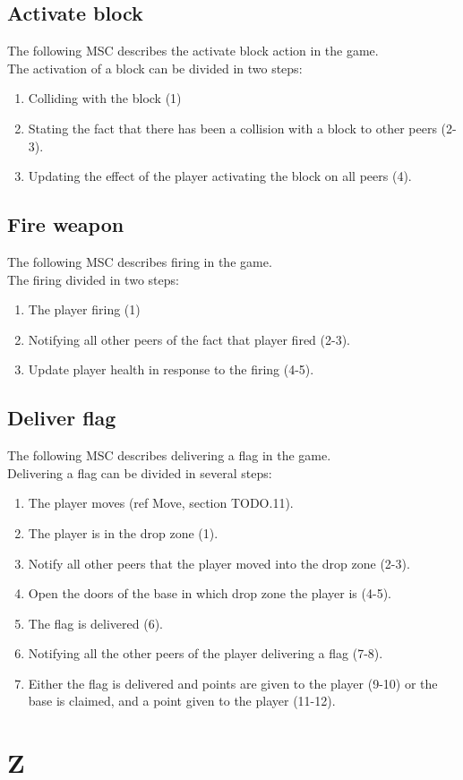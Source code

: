 \documentclass[a4paper,twoside,11pt]{article}
\begin{document}
\subsection{Activate block}
The following MSC describes the activate block action in the game.\\
The activation of a block can be divided in two steps:
\begin{enumerate}
\item Colliding with the block (1)
\item Stating the fact that there has been a collision with a block to other peers (2-3).
\item Updating the effect of the player activating the block on all peers (4).
\end{enumerate}

\subsection{Fire weapon}
The following MSC describes firing in the game.\\
The firing divided in two steps:
\begin{enumerate}
\item The player firing (1)
\item Notifying all other peers of the fact that player fired (2-3).
\item Update player health in response to the firing (4-5).
\end{enumerate}

\subsection{Deliver flag}
The following MSC describes delivering a flag in the game.\\
Delivering a flag can be divided in several steps:
\begin{enumerate}
\item The player moves (ref Move, section TODO.11).
\item The player is in the drop zone (1).
\item Notify all other peers that the player moved into the drop zone (2-3).
\item Open the doors of the base in which drop zone the player is (4-5).
\item The flag is delivered (6).
\item Notifying all the other peers of the player delivering a flag (7-8).
\item Either the flag is delivered and points are given to the player (9-10) or the base is claimed, and a point given to the player (11-12).  
\end{enumerate}

\section{Z}
\end{document}
